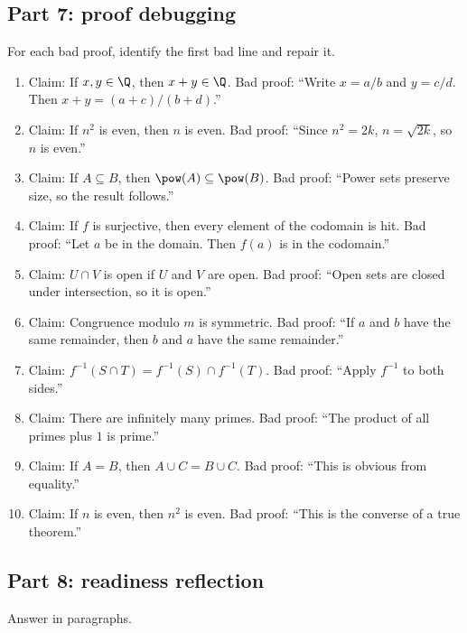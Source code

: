 \subsection{Part 7: proof debugging}

For each bad proof, identify the first bad line and repair it.

\begin{enumerate}
\item Claim: If $x,y\in\Q$, then $x+y\in\Q$. Bad proof: ``Write $x=a/b$ and $y=c/d$. Then $x+y=(a+c)/(b+d)$.''
\item Claim: If $n^2$ is even, then $n$ is even. Bad proof: ``Since $n^2=2k$, $n=\sqrt{2k}$, so $n$ is even.''
\item Claim: If $A\subseteq B$, then $\pow(A)\subseteq\pow(B)$. Bad proof: ``Power sets preserve size, so the result follows.''
\item Claim: If $f$ is surjective, then every element of the codomain is hit. Bad proof: ``Let $a$ be in the domain. Then $f(a)$ is in the codomain.''
\item Claim: $U\cap V$ is open if $U$ and $V$ are open. Bad proof: ``Open sets are closed under intersection, so it is open.''
\item Claim: Congruence modulo $m$ is symmetric. Bad proof: ``If $a$ and $b$ have the same remainder, then $b$ and $a$ have the same remainder.''
\item Claim: $f^{-1}(S\cap T)=f^{-1}(S)\cap f^{-1}(T)$. Bad proof: ``Apply $f^{-1}$ to both sides.''
\item Claim: There are infinitely many primes. Bad proof: ``The product of all primes plus $1$ is prime.''
\item Claim: If $A=B$, then $A\cup C=B\cup C$. Bad proof: ``This is obvious from equality.''
\item Claim: If $n$ is even, then $n^2$ is even. Bad proof: ``This is the converse of a true theorem.''
\end{enumerate}

\subsection{Part 8: readiness reflection}

Answer in paragraphs.


